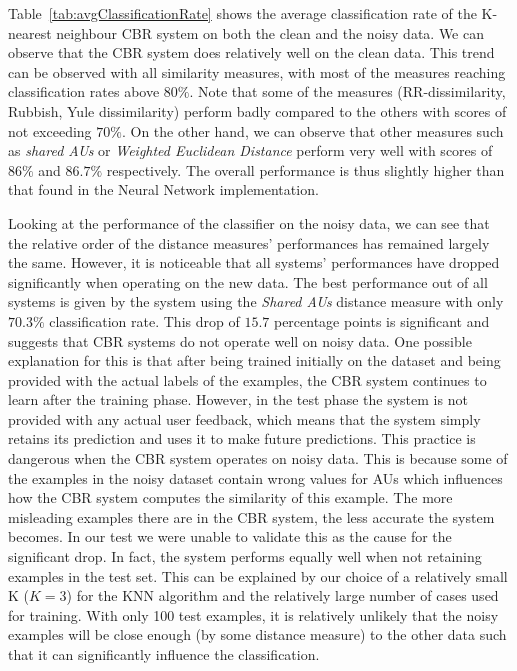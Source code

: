 \documentclass[10pt,a4paper]{article}
\begin{document}
Table~\ref{tab:avgClassificationRate} shows the average classification rate of the K-nearest neighbour CBR system on both the clean and the noisy data. We can observe that the CBR system does relatively well on the clean data. This trend can be observed with all similarity measures, with most of the measures reaching classification rates above $80\%$. Note that some of the measures (RR-dissimilarity, Rubbish, Yule dissimilarity) perform badly compared to the others with scores of not exceeding $70\%$. On the other hand, we can observe that other measures such as \emph{shared AUs} or \emph{Weighted Euclidean Distance} perform very well with scores of $86\%$ and $86.7\%$ respectively. The overall performance is thus slightly higher than that found in the Neural Network implementation.

Looking at the performance of the classifier on the noisy data, we can see that the relative order of the distance measures' performances has remained largely the same. However, it is noticeable that all systems' performances have dropped significantly when operating on the new data. The best performance out of all systems is given by the system using the \emph{Shared AUs} distance measure with only $70.3\%$ classification rate. This drop of $15.7$ percentage points is significant and suggests that CBR systems do not operate well on noisy data.
One possible explanation for this is that after being trained initially on the dataset and being provided with the actual labels of the examples, the CBR system continues to learn after the training phase. However, in the test phase the system is not provided with any actual user feedback, which means that the system simply retains its prediction and uses it to make future predictions. This practice is dangerous when the CBR system operates on noisy data. This is because some of the examples in the noisy dataset contain wrong values for AUs which influences how the CBR system computes the similarity of this example. The more misleading examples there are in the CBR system, the less accurate the system becomes. In our test we were unable to validate this as the cause for the significant drop. In fact, the system performs equally well when not retaining examples in the test set. This can be explained by our choice of a relatively small K ($K=3$) for the KNN algorithm and the relatively large number of cases used for training. With only 100 test examples, it is relatively unlikely that the noisy examples will be close enough (by some distance measure) to the other data such that it can significantly influence the classification.
\end{document}
